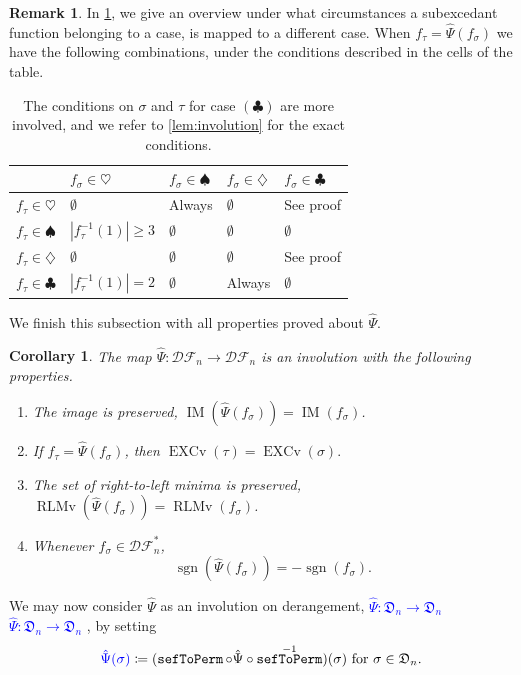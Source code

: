 \documentclass[reqno]{amsart}
\newtheorem{corollary}[theorem]{Corollary}
\theoremstyle{definition}
\newtheorem{remark}[theorem]{Remark}
\newcommand{\defin}[1]{%
\relax\ifmmode%
\textcolor{blue}{#1}%
\else\textcolor{blue}{\emph{#1}}%
\fi%
}
\newcommand{\dArr}{\mathfrak{D}}
\newcommand{\DSEF}{\mathcal{DF}}%
\newcommand{\fretherD}{\hat{\Psi}}
\newcommand{\caseOne}{\ensuremath{\heartsuit}}
\newcommand{\caseTwo}{\ensuremath{\spadesuit}}
\newcommand{\caseThree}{\ensuremath{\diamondsuit}}
\newcommand{\caseFour}{\ensuremath{\clubsuit}}
\DeclareMathOperator{\sgn}{sgn}
\DeclareMathOperator{\EXCv}{EXCv}
\DeclareMathOperator{\RLMv}{RLMv}
\DeclareMathOperator{\supp}{IM}
\DeclareMathOperator{\sefToPerm}{\mathtt{sefToPerm}}
\begin{document}
\begin{remark}
In \cref{tab:casesCombinations}, we give an overview under what circumstances 
a subexcedant function belonging to a case, is mapped to a different case.
When $f_\tau = \fretherD(f_\sigma)$ we have the following combinations, under the 
conditions described in the cells of the table.
%
\begin{table}[!ht]
\begin{center}
\begin{tabular}{lp{2cm}p{2cm}p{2cm}p{2cm}}
 \; & $f_\sigma\in\caseOne$ & $f_\sigma\in\caseTwo$ & $f_\sigma\in\caseThree$ & $f_\sigma\in\caseFour$ \\
   \toprule 
$f_\tau\in\caseOne$   & $\emptyset$  & Always & $\emptyset$ & See proof \\
$f_\tau\in\caseTwo$   & $|f_\tau^{-1}(1)|\geq 3$  & $\emptyset$ & $\emptyset$ & $\emptyset$\\
$f_\tau\in\caseThree$ & $\emptyset$  & $\emptyset$ & $\emptyset$ & See proof\\
$f_\tau\in\caseFour$  & $|f_\tau^{-1}(1)| =2$  & $\emptyset$ & Always & $\emptyset$
\end{tabular}
\caption{
The conditions on $\sigma$ and $\tau$ for case $(\caseFour)$
are more involved, and we refer to \cref{lem:involution} for the exact conditions.
}\label{tab:casesCombinations}
\end{center}
\end{table}
\end{remark}


We finish this subsection with all properties proved about $\fretherD$.
\begin{corollary}\label{cor:fretherDProps}
The map $\fretherD:\DSEF_n\longrightarrow \DSEF_n$
is an involution with the following properties.
%
\begin{enumerate}[label=(\roman*)]
\item 
	The image is preserved, $\supp(\fretherD(f_\sigma )) = \supp( f_\sigma )$.
\item 
	If $f_\tau = \fretherD(f_{\sigma})$, then 
	$
		\EXCv(\tau) = \EXCv(\sigma).
	$
\item 
	The set of right-to-left minima is preserved,
	$\RLMv( \fretherD(f_\sigma ) ) = \RLMv( f_\sigma )$.
\item 
	Whenever $f_\sigma \in \DSEF^*_n$, 
	\[
	\sgn(\fretherD(f_\sigma )) = -\sgn( f_\sigma ).
	\]
\end{enumerate} 
\end{corollary}
We may now consider $\fretherD$ as an involution on derangement, \defin{$\fretherD:\dArr_n \to \dArr_n$},
by setting
\[
  \defin{\fretherD(\sigma)} \coloneqq (\sefToPerm \circ \fretherD \circ \sefToPerm^{-1})(\sigma)
  \text{ for $\sigma \in \dArr_n$.}
\]
\end{document}
